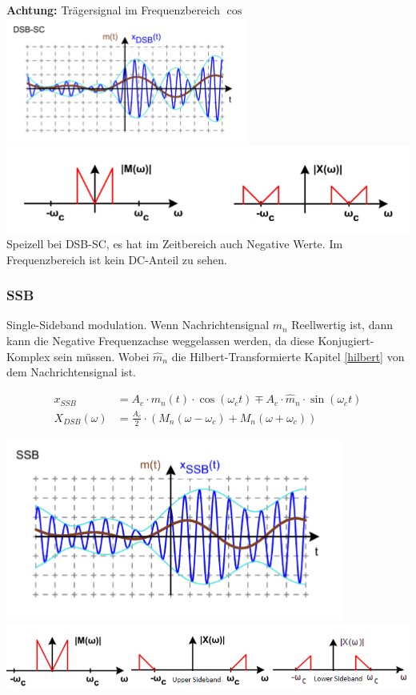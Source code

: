 \noindent\textbf{Achtung:} Trägersignal im Frequenzbereich $\cos$ ~\\

\noindent\includegraphics[width=0.4\columnwidth]{Images/dsb_sc} \includegraphics[width=0.6\columnwidth]{Images/dsb_sc_f} \\

\noindent Speizell bei DSB-SC, es hat im Zeitbereich auch Negative Werte. Im Frequenzbereich ist kein DC-Anteil zu sehen.

\subsubsection{SSB}
Single-Sideband modulation. Wenn Nachrichtensignal $m_n$ Reellwertig ist, dann kann die Negative Frequenzachse weggelassen werden, da diese Konjugiert-Komplex sein müssen. Wobei $\hat{m}_n$ die Hilbert-Transformierte Kapitel \ref{hilbert} von dem Nachrichtensignal ist.

\begin{align*}
	x_{SSB} &= A_c \cdot m_n(t) \cdot \cos(\omega_ct) \mp A_c\cdot \hat{m}_n\cdot \sin(\omega_ct) \\
	X_{DSB}(\omega) &= \frac{A_c}{2}\cdot(M_n(\omega - \omega_c) + M_n(\omega + \omega_c))
\end{align*}

\noindent\includegraphics[width=0.3\columnwidth]{Images/ssb} \includegraphics[width=0.7\columnwidth]{Images/ssb_f}\\ 

